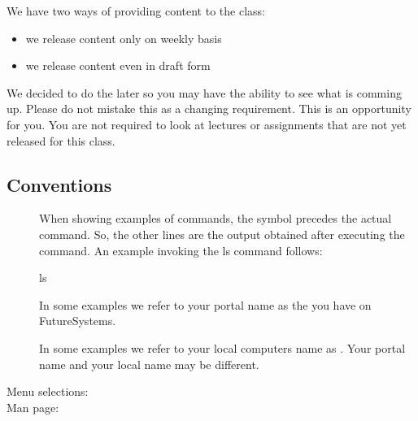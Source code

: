 We have two ways of providing content to the class:
\begin{itemize}
\item {} 
we release content only on weekly basis

\item {} 
we release content even in draft form

\end{itemize}

We decided to do the later so you may have the ability to see what is
comming up. Please do not mistake this as a changing requirement. This
is an opportunity for you. You are not required to look at lectures or
assignments that are not yet released for this class.


\subsection{Conventions}
\label{\detokenize{i524/preface/convention::doc}}\label{\detokenize{i524/preface/convention:conventions}}\begin{description}
\item[{\sphinxtitleref{\$}}] \leavevmode
When showing examples of commands, the \sphinxtitleref{\$} symbol precedes the
actual command. So, the other lines are the output obtained after
executing the command. An example invoking the ls command
follows:

\begin{sphinxVerbatim}[commandchars=\\\{\}]
\PYGZdl{} ls
\end{sphinxVerbatim}

\item[{}] \leavevmode
In some examples we refer to your portal name as the 
you have on FutureSystems.

\item[{}] \leavevmode
In some examples we refer to your local computers name as
. Your portal name and your local name may be
different.

\item[{Menu selections:}] \leavevmode
{}

\item[{Man page:}] \leavevmode
{}

\end{description}


